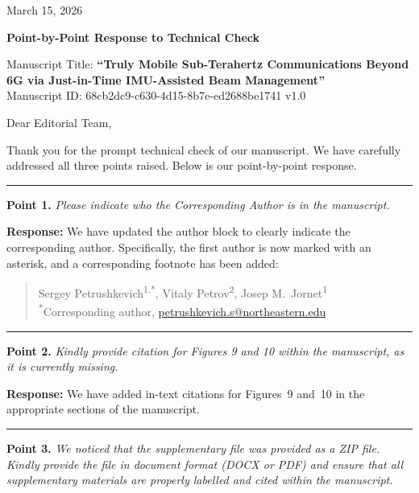 \documentclass[11pt]{letter}
\begin{document}
\begin{flushright}
March 15, 2026
\end{flushright}

\bigskip
\noindent
\textbf{\large Point-by-Point Response to Technical Check}

\medskip
\noindent
Manuscript Title: \textbf{``Truly Mobile Sub-Terahertz Communications Beyond 6G via Just-in-Time IMU-Assisted Beam Management''}\\
Manuscript ID: 68cb2dc9-c630-4d15-8b7e-ed2688be1741 v1.0

\bigskip
\noindent
Dear Editorial Team,

\medskip
\noindent
Thank you for the prompt technical check of our manuscript. We have carefully addressed all three points raised. Below is our point-by-point response.

\bigskip
\noindent
\rule{\textwidth}{0.4pt}

\bigskip
\noindent
\textbf{Point 1.} \textit{Please indicate who the Corresponding Author is in the manuscript.}

\medskip
\noindent
\textbf{Response:} We have updated the author block to clearly indicate the corresponding author. Specifically, the first author is now marked with an asterisk, and a corresponding footnote has been added:

\smallskip
\begin{quote}
\noindent
Sergey Petrushkevich\textsuperscript{1,*}, Vitaly Petrov\textsuperscript{2}, Josep M.\ Jornet\textsuperscript{1}\\[4pt]
\textsuperscript{*}Corresponding author, \href{mailto:petrushkevich.s@northeastern.edu}{petrushkevich.s@northeastern.edu}
\end{quote}

\bigskip
\noindent
\rule{\textwidth}{0.4pt}

\bigskip
\noindent
\textbf{Point 2.} \textit{Kindly provide citation for Figures 9 and 10 within the manuscript, as it is currently missing.}

\medskip
\noindent
\textbf{Response:} We have added in-text citations for Figures~9 and~10 in the appropriate sections of the manuscript.

\bigskip
\noindent
\rule{\textwidth}{0.4pt}

\bigskip
\noindent
\textbf{Point 3.} \textit{We noticed that the supplementary file was provided as a ZIP file. Kindly provide the file in document format (DOCX or PDF) and ensure that all supplementary materials are properly labelled and cited within the manuscript.}
\end{document}
